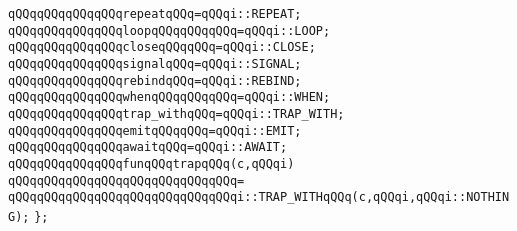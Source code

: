 \verb|qQQqqQQqqQQqqQQqrepeatqQQq=qQQqi::REPEAT;|\newline
\verb|qQQqqQQqqQQqqQQqloopqQQqqQQqqQQq=qQQqi::LOOP;|\newline
\verb|qQQqqQQqqQQqqQQqcloseqQQqqQQq=qQQqi::CLOSE;|\newline
\verb|qQQqqQQqqQQqqQQqsignalqQQq=qQQqi::SIGNAL;|\newline
\verb|qQQqqQQqqQQqqQQqrebindqQQq=qQQqi::REBIND;|\newline
\verb|qQQqqQQqqQQqqQQqwhenqQQqqQQqqQQq=qQQqi::WHEN;|\newline
\verb|qQQqqQQqqQQqqQQqtrap_withqQQq=qQQqi::TRAP_WITH;|\newline
\verb|qQQqqQQqqQQqqQQqemitqQQqqQQq=qQQqi::EMIT;|\newline
\verb|qQQqqQQqqQQqqQQqawaitqQQq=qQQqi::AWAIT;|\newline
\newline
\verb|qQQqqQQqqQQqqQQqfunqQQqtrapqQQq(c,qQQqi)|\newline
\verb|qQQqqQQqqQQqqQQqqQQqqQQqqQQqqQQq=|\newline
\verb|qQQqqQQqqQQqqQQqqQQqqQQqqQQqqQQqi::TRAP_WITHqQQq(c,qQQqi,qQQqi::NOTHING);|\newline
\newline
\verb|};|\newline
\newline


